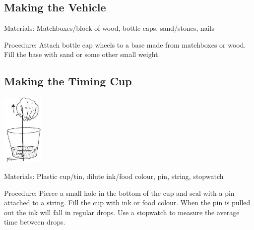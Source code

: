 \begin{multicols}{2}
\subsection{Making the Vehicle}

\begin{description*}
\item[Materials:]{Matchboxes/block of wood, bottle caps, sand/stones, nails}
\item[Procedure:]{Attach bottle cap wheels to a base made from matchboxes or wood. Fill the base with sand or some other small weight.}
\end{description*}

\subsection{Making the Timing Cup}

\begin{center}
\includegraphics[width=0.15\textwidth]{./img/vso/timing-cup.png}
\end{center}

\begin{description*}
\item[Materials:]{Plastic cup/tin, dilute ink/food colour, pin, string, stopwatch}
\item[Procedure:]{Pierce a small hole in the bottom of the cup and seal with a pin attached to a string. Fill the cup with ink or food colour. When the pin is pulled out the ink will fall in regular drops. Use a stopwatch to measure the average time between drops.}
\end{description*}


\end{multicols}
